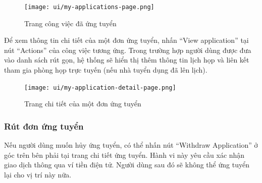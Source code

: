 \begin{figure}[H]
  \centering
  \texttt{[image: ui/my-applications-page.png]}
  \caption{Trang công việc đã ứng tuyển}
  \label{fig:my-applications-page}
\end{figure}

Để xem thông tin chi tiết của một đơn ứng tuyển, nhấn ``View application'' tại nút ``Actions'' của công việc tương ứng. 
Trong trường hợp người dùng được đưa vào danh sách rút gọn, hệ thống sẽ hiển thị thêm thông tin lịch họp và liên kết tham gia phòng họp trực tuyến (nếu nhà tuyển dụng đã lên lịch).

\begin{figure}[H]
  \centering
  \texttt{[image: ui/my-application-detail-page.png]}
  \caption{Trang chi tiết của một đơn ứng tuyển}
  \label{fig:my-application-detail-page}
\end{figure}

\subsubsection{Rút đơn ứng tuyển}

Nếu người dùng muốn hủy ứng tuyển, có thể nhấn nút ``Withdraw Application'' ở góc trên bên phải tại trang chi tiết ứng tuyển. Hành vi này yêu cầu xác nhận giao dịch thông qua ví tiền điện tử.
Người dùng sau đó sẽ không thể ứng tuyển lại cho vị trí này nữa.